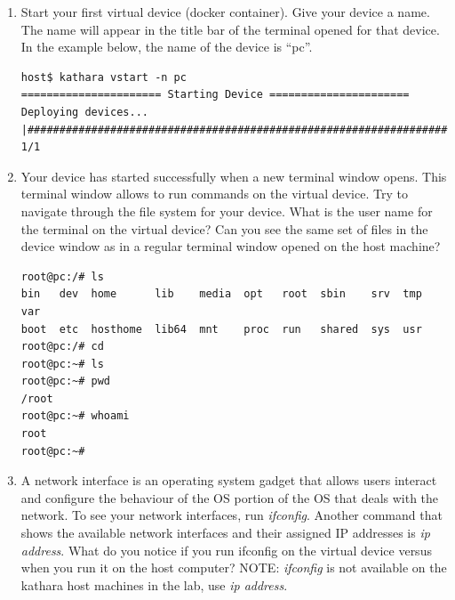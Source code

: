 \documentclass[12pt]{book}
\newcommand{\kathara}{Kathar\'a}
\begin{document}
\begin{enumerate}[label=Activity \arabic*:]
    

  
\item Start your first virtual device (docker container). Give your device a name. The name will appear in the title bar of the terminal opened for that device. In the example below, the name of the device is ``pc''.

  \begin{lstlisting}
host$ kathara vstart -n pc
====================== Starting Device ======================
Deploying devices... |##################################################################| 1/1
\end{lstlisting}
  
\item Your device has started successfully when a new terminal window opens. This terminal window allows to run commands on the virtual device. Try to navigate through the file system for your device. What is the user name for the terminal on the virtual device? Can you see the same set of files in the device window as in a regular terminal window opened on the host machine?

\begin{lstlisting}
root@pc:/# ls
bin   dev  home      lib    media  opt   root  sbin    srv  tmp  var
boot  etc  hosthome  lib64  mnt    proc  run   shared  sys  usr
root@pc:/# cd 
root@pc:~# ls
root@pc:~# pwd
/root
root@pc:~# whoami
root
root@pc:~# 
\end{lstlisting}

\item A network interface is an operating system gadget that allows users interact and configure the behaviour of the OS portion of the OS that deals with the network. To see your network interfaces, run \emph{ifconfig}. Another command that shows the available network interfaces and their assigned IP addresses is \emph{ip address}. What do you notice if you run ifconfig on the virtual device versus when you run it on the host computer? NOTE: \emph{ifconfig} is not available on the kathara host machines in the lab, use \emph{ip address}.


\end{enumerate}
\end{document}
